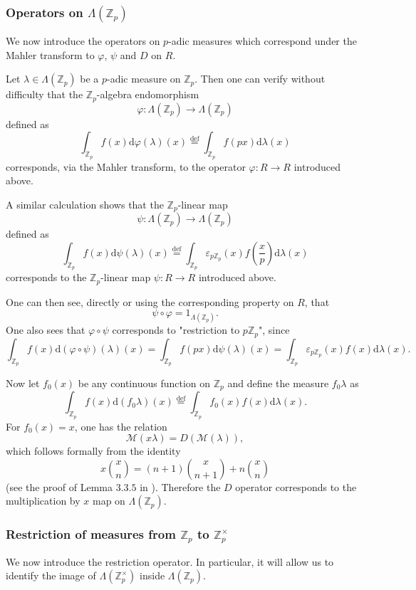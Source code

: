 \documentclass[twoside,10pt]{article}
\newcommand{\rarr}{\rightarrow}
\newcommand{\Z}{\mathbb{Z}}
\newcommand{\curlM}{\mathcal{M}}
\newcommand{\eqdef}{\overset{\text{def}}{=}}
\newcommand{\charf}{\varepsilon}
\renewcommand{\d}{\text{d}}
\begin{document}
\subsubsection*{Operators on $\Lambda(\Z_p)$}
We now introduce the operators on $p$-adic measures which correspond under the Mahler transform to $\varphi$, $\psi$ and $D$ on $R$.

Let $\lambda\in\Lambda(\Z_p)$ be a $p$-adic measure on $\Z_p$. Then one can verify  without difficulty that the $\Z_p$-algebra endomorphism
\[\varphi:\Lambda(\Z_p)\rarr\Lambda(\Z_p)\]
defined as
\[\int_{\Z_p}f(x)\d\varphi(\lambda)(x)\eqdef\int_{\Z_p}f(px)\d\lambda(x)\]
corresponds, via the Mahler transform, to the operator $\varphi:R\rarr R$ introduced above.

A similar calculation shows that the $\Z_p$-linear map
\[\psi:\Lambda(\Z_p)\rarr\Lambda(\Z_p)\]
defined as
\[\int_{\Z_p}f(x)\d\psi(\lambda)(x)\eqdef\int_{\Z_p}\charf_{p\Z_p}(x)f\left (\frac{x}{p}\right )\d\lambda(x)\]
corresponds to the $\Z_p$-linear map $\psi:R\rarr R$ introduced above.

One can then see, directly or using the corresponding property on $R$, that
\[\psi\circ\varphi=1_{\Lambda(\Z_p)}.\]
One also sees that $\varphi\circ\psi$ corresponds to "restriction to $p\Z_p$", since
\[\int_{\Z_p}f(x)\d(\varphi\circ\psi)(\lambda)(x)=\int_{\Z_p}f(px)\d\psi(\lambda)(x)=\int_{\Z_p}\charf_{p\Z_p}(x)f(x)\d\lambda(x).\]

Now let $f_0(x)$ be any continuous function on $\Z_p$ and define the measure $f_0\lambda$ as
\[\int_{\Z_p}f(x)\d(f_0\lambda)(x)\eqdef\int_{\Z_p}f_0(x)f(x)\d\lambda(x).\]
For $f_0(x)=x$, one has the relation
\[\curlM(x\lambda)=D(\curlM(\lambda)),\]
which follows formally from the identity
\[x\binom{x}{n}=(n+1)\binom{x}{n+1}+n\binom{x}{n}\]
(see the proof of Lemma $3.3.5$ in \cite{CS}). Therefore the $D$ operator corresponds to the multiplication by $x$ map on $\Lambda(\Z_p)$.

\subsubsection*{Restriction of measures from $\Z_p$ to $\Z_p^\times$}
We now introduce the restriction operator. In particular, it will allow us to identify the image of $\Lambda(\Z_p^\times)$ inside $\Lambda(\Z_p)$.
\end{document}
